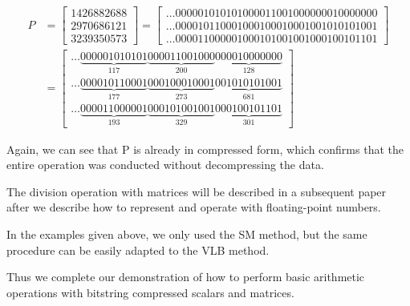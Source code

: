\documentclass[12pt]{article}
\begin{document}
\begin{align}
	P &= \begin{bmatrix}
			1426882688\\ 
			2970686121\\ 
			3239350573
		\end{bmatrix} 
        =
        \begin{bmatrix}
   			\ldots000001010101000011001000000010000000 \\
			\ldots000010110001000100010001001010101001\\
			\ldots000011000001000101001001000100101101
		\end{bmatrix}
      \\ \nonumber
        &=        \begin{bmatrix}
\ldots\underbrace{000001010101}_{117}\underbrace{000011001000}_{200}\underbrace{
000010000000}_{128}\\
\ldots\underbrace{000010110001}_{177}\underbrace{000100010001}_{273}\underbrace{
001010101001}_{681}\\
\ldots\underbrace{000011000001}_{193}\underbrace{000101001001}_{329}\underbrace{
000100101101}_{301} 			 
        \end{bmatrix}
\end{align}

Again, we can see that P is already in compressed form, which confirms that the
entire operation was conducted without decompressing the data.

The division operation with matrices will be described in a subsequent paper
after we describe how to represent and operate with floating-point numbers.

In the examples given above, we only used the SM method, but the same procedure
can be easily adapted to the VLB method.

Thus we complete our demonstration of how to perform basic arithmetic
operations with bitstring compressed scalars and matrices.


\end{document}
